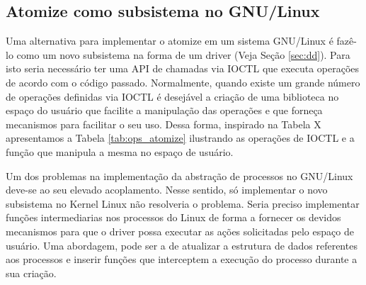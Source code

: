 

\subsection{Atomize como subsistema no GNU/Linux}

Uma alternativa para implementar o atomize em um sistema GNU/Linux é fazê-lo
como um novo subsistema na forma de um driver (Veja Seção \ref{sec:dd}). Para
isto seria necessário ter uma API de chamadas via IOCTL que executa operações
de acordo com o código passado. Normalmente, quando existe um grande número de
operações definidas via IOCTL é desejável a criação de uma biblioteca no espaço
do usuário que facilite a manipulação das operações e que forneça mecanismos
para facilitar o seu uso. Dessa forma, inspirado na Tabela X apresentamos a
Tabela \ref{tab:ops_atomize} ilustrando as operações de IOCTL e a função que
manipula a mesma no espaço de usuário.



Um dos problemas na implementação da abstração de processos no GNU/Linux
deve-se ao seu elevado acoplamento. Nesse sentido, só implementar o novo
subsistema no Kernel Linux não resolveria o problema. Seria preciso implementar
funções intermediarias nos processos do Linux de forma a fornecer os devidos
mecanismos para que o driver possa executar as ações solicitadas pelo espaço de
usuário. Uma abordagem, pode ser a de atualizar a estrutura de dados referentes
aos processos e inserir funções que interceptem a execução do processo durante
a sua criação.

